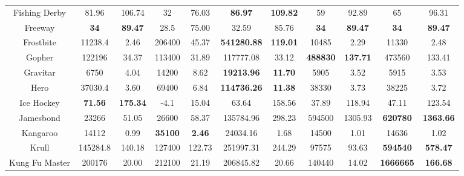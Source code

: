 \documentclass[nohyperref]{article}
\newcommand{\best}[1]{\textbf{#1}}
\theoremstyle{plain}
\begin{document}
\begin{table}[!hb]
\begin{center}
\begin{tabular}{|c| c c| c c| c c| c c| c c| }
 Fishing Derby      & 81.96             & 106.74      & 32              & 76.03          & \textbf{86.97}       &\textbf{109.82}         &59                &92.89   &65                &96.31    \\
 Freeway            & \textbf{34}       & \textbf{89.47}       & 28.5            & 75.00          & 32.59                &85.76          &\best{34}         &\textbf{89.47} &\textbf{34}         &\textbf{89.47}       \\
 Frostbite          & 11238.4           & 2.46        & 206400          & 45.37          &\textbf{541280.88}    &\textbf{119.01}         &10485             &2.29    &11330            &2.48    \\
 Gopher             & 122196            & 34.37       & 113400          & 31.89          & 117777.08            &33.12          &\best{488830}     &\textbf{137.71}  &473560           &133.41    \\
 Gravitar           & 6750              & 4.04        & 14200           & 8.62           &\textbf{19213.96}     &\textbf{11.70}          &5905              &3.52    &5915             &3.53    \\
 Hero               & 37030.4           & 3.60        & 69400           & 6.84           &\textbf{114736.26}    &\textbf{11.38}          &38330             &3.73    &38225            &3.72    \\
 Ice Hockey         & \textbf{71.56}    & \textbf{175.34}      &-4.1             & 15.04          & 63.64                &158.56         &37.89             &118.94  &47.11           &123.54    \\
 Jamesbond          & 23266             & 51.05       & 26600           & 58.37          & 135784.96            &298.23         &594500              &1305.93 &\textbf{620780}          &\textbf{1363.66}    \\
 Kangaroo           & 14112             & 0.99        & \textbf{35100}  & \textbf{2.46}           &24034.16              &1.68           &14500             &1.01    &14636           &1.02    \\
 Krull              & 145284.8          & 140.18      & 127400          & 122.73         & 251997.31   &244.29         &97575             &93.63   &\textbf{594540}          &\textbf{578.47}    \\
 Kung Fu Master     & 200176            & 20.00       & 212100          & 21.19          & 206845.82            &20.66          &140440            &14.02            &\textbf{1666665}	          &\textbf{166.68}\\

\end{tabular}
\end{center}
\end{table}
\end{document}
